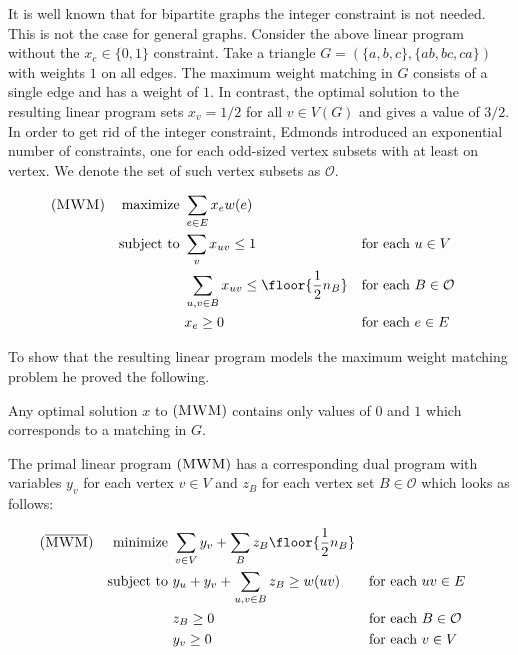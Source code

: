 It is well known that for bipartite graphs the integer constraint is not needed. This is not the case for general graphs. Consider the above linear program without the $x_e \in \{0,1\}$ constraint. Take a triangle $G = (\{a, b, c\}, \{ab, bc, ca\})$ with weights $1$ on all edges. The maximum weight matching in $G$ consists of a single edge and has a weight of $1$. In contrast, the optimal solution to the resulting linear program sets $x_v = 1/2$ for all $v \in V(G)$ and gives a value of $3/2$. In order to get rid of the integer constraint, Edmonds introduced an exponential number of constraints, one for each odd-sized vertex subsets with at least on vertex. We denote the set of such vertex subsets as $\mathcal{O}$.

\begin{align*}
(\textsc{MWM})
&&  \text{maximize }  & \sum_{e \in E} x_e w(e)\\
&& \text{subject to } & \sum_v x_{uv} \leq 1 &&\text{for each $u \in V$} \\
&&                    & \sum_{u, v \in B} x_{uv} \leq \floor{\frac{1}{2}n_B} &&\text{for each $B \in \mathcal{O}$} \\
&&                    & x_e \geq 0 &&\text{for each $e \in E$}
\end{align*}

To show that the resulting linear program models the maximum weight matching problem he proved the following.

\begin{theorem}
    Any optimal solution $x$ to $(\textsc{MWM})$ contains only values of $0$ and $1$ which corresponds to a matching in $G$.
\end{theorem}

The primal linear program $(\textsc{MWM})$ has a corresponding dual program with variables $y_v$ for each vertex $v \in V$ and $z_B$ for each vertex set $B \in \mathcal{O}$ which looks as follows:

\begin{align*}
(\overline{\textsc{MWM}})
&& \text{minimize }   & \sum_{v\in V}y_v + \sum_{B} z_B \floor{\frac{1}{2}n_B} \\
&& \text{subject to } & y_u + y_v + \sum_{u, v \in B} z_B \geq w(uv) &&\text{for each $uv \in E$} \\
&&                    & z_B \geq 0 &&\text{for each $B \in \mathcal{O}$} \\
&&                    & y_v \geq 0 &&\text{for each $v \in V$}
\end{align*}

